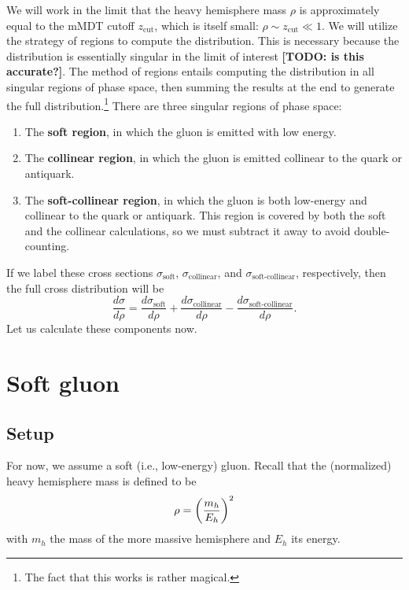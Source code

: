 \documentclass[../thesis.tex]{subfiles}
\providecommand{\zcut}{z_\mathrm{{cut}}}
\begin{document}
	We will work in the limit that the heavy hemisphere mass $\rho$ is approximately equal to the mMDT cutoff $\zcut$, which is itself small: $\rho \sim \zcut \ll 1$. We will utilize the strategy of regions \cite{becher_introduction_2015-1} to compute the distribution. This is necessary because the distribution is essentially singular in the limit of interest {\color{red}\textbf{[TODO: is this accurate?]}}. The method of regions entails computing the distribution in all singular regions of phase space, then summing the results at the end to generate the full distribution.\footnote{The fact that this works is rather magical.} There are three singular regions of phase space:
	\begin{enumerate}
		\item The \textbf{soft region}, in which the gluon is emitted with low energy.

		\item The \textbf{collinear region}, in which the gluon is emitted collinear to the quark or antiquark.

		\item The \textbf{soft-collinear region}, in which the gluon is both low-energy and collinear to the quark or antiquark. This region is covered by both the soft and the collinear calculations, so we must subtract it away to avoid double-counting.
	\end{enumerate}
	If we label these cross sections $\sigma_\text{soft}$, $\sigma_\text{collinear}$, and $\sigma_\text{soft-collinear}$, respectively, then the full cross distribution will be
	\begin{equation}
		\frac{d\sigma}{d\rho} = \frac{d\sigma_\text{soft}}{d\rho} + \frac{d\sigma_\text{collinear}}{d\rho} - \frac{d\sigma_\text{soft-collinear}}{d\rho}.
	\end{equation}
	Let us calculate these components now.

\section{Soft gluon}
\subsection{Setup}
	For now, we assume a soft (i.e., low-energy) gluon. Recall that the (normalized) heavy hemisphere mass is defined to be
	\begin{equation}
		\rho = \qty(\frac{m_h}{E_h})^2
	\end{equation}
	with $m_h$ the mass of the more massive hemisphere and $E_h$ its energy.
\end{document}

